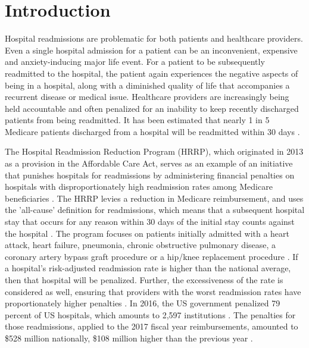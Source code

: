 \documentclass[sigconf]{acmart}
\begin{document}

\maketitle

\section{Introduction}

Hospital readmissions are problematic for both patients and healthcare providers. Even a single hospital admission for a patient can be an inconvenient, expensive and anxiety-inducing major life event. For a patient to be subsequently readmitted to the hospital, the patient again experiences the negative aspects of being in a hospital, along with a diminished quality of life that accompanies a recurrent disease or medical issue. Healthcare providers are increasingly being held accountable and often penalized for an inability to keep recently discharged patients from being readmitted. It has been estimated that nearly 1 in 5 Medicare patients discharged from a hospital will be readmitted within 30 days \cite{cite05}.

The Hospital Readmission Reduction Program (HRRP), which originated in 2013 as a provision in the Affordable Care Act, serves as an example of an initiative that punishes hospitals for readmissions by administering financial penalties on hospitals with disproportionately high readmission rates among Medicare beneficiaries \cite{cite06}. The HRRP levies a reduction in Medicare reimbursement, and uses the 'all-cause' definition for readmissions, which means that a subsequent hospital stay that occurs for any reason within 30 days of the initial stay counts against the hospital \cite{cite06}. The program focuses on patients initially admitted with a heart attack, heart failure, pneumonia, chronic obstructive pulmonary disease, a coronary artery bypass graft procedure or a hip/knee replacement procedure \cite{cite06}. If a hospital's risk-adjusted readmission rate is higher than the national average, then that hospital will be penalized. Further, the excessiveness of the rate is considered as well, ensuring that providers with the worst readmission rates have proportionately higher penalties \cite{cite06}. In 2016, the US government penalized 79 percent of US hospitals, which amounts to 2,597 institutions \cite{cite00}. The penalties for those readmissions, applied to the 2017 fiscal year reimbursements, amounted to \$528 million nationally, \$108 million higher than the previous year \cite{cite00}.
\end{document}
